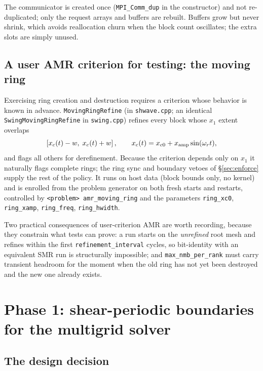 \documentclass[11pt]{article}
\newcommand{\code}[1]{\texttt{#1}}
\newcommand{\file}[1]{\texttt{\small #1}}
\newcommand{\fn}[1]{\texttt{\small #1}}
\begin{document}
The communicator is created once (\code{MPI\_Comm\_dup} in the constructor) and not
re-duplicated; only the request arrays and buffers are rebuilt. Buffers grow but never
shrink, which avoids reallocation churn when the block count oscillates; the extra
slots are simply unused.

\subsection{A user AMR criterion for testing: the moving ring}
\label{sec:movingring}

Exercising ring creation and destruction requires a criterion whose behavior is known
in advance. \fn{MovingRingRefine} (in \file{shwave.cpp}; an identical
\fn{SwingMovingRingRefine} in \file{swing.cpp}) refines every block whose $x_1$ extent
overlaps
\begin{equation}
  \left[x_c(t) - w,\; x_c(t) + w\right], \qquad
  x_c(t) = x_{c0} + x_{\rm amp}\sin(\omega_r t),
\end{equation}
and flags all others for derefinement. Because the criterion depends only on $x_1$ it
naturally flags complete rings; the ring sync and boundary vetoes of
\S\ref{sec:enforce} supply the rest of the policy. It runs on host data (block bounds
only, no kernel) and is enrolled from the problem generator on both fresh starts and
restarts, controlled by \code{<problem> amr\_moving\_ring} and the parameters
\code{ring\_xc0}, \code{ring\_xamp}, \code{ring\_freq}, \code{ring\_hwidth}.

Two practical consequences of user-criterion AMR are worth recording, because they
constrain what tests can prove: a run starts on the \emph{unrefined} root mesh and
refines within the first \code{refinement\_interval} cycles, so bit-identity with an
equivalent SMR run is structurally impossible; and \code{max\_nmb\_per\_rank} must
carry transient headroom for the moment when the old ring has not yet been destroyed
and the new one already exists.

\section{Phase 1: shear-periodic boundaries for the multigrid solver}
\label{sec:phase1}

\subsection{The design decision}
\end{document}
